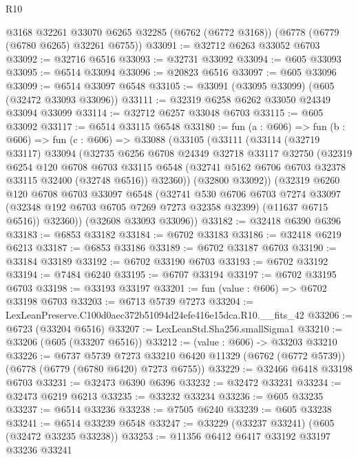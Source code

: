 \begin{lexlean}{R10}
\begin{coremodule}
    @3168
    @32261
    @33070
    @6265
    @32285
    (@6762 (@6772 @3168))
    (@6778 (@6779 (@6780 @6265) @32261 @6755))
@33091 := @32712 @6263 @33052 @6703
@33092 := @32716 @6516
@33093 := @32731 @33092
@33094 := @605 @33093
@33095 := @6514 @33094
@33096 := @20823 @6516
@33097 := @605 @33096
@33099 := @6514 @33097 @6548
@33105 := @33091 (@33095 @33099) (@605 (@32472 @33093 @33096))
@33111 := @32319 @6258 @6262 @33050 @24349 @33094 @33099
@33114 := @32712 @6257 @33048 @6703
@33115 := @605 @33092
@33117 := @6514 @33115 @6548
@33180 := fun (a : @606) =>
  fun (b : @606) =>
  fun (c : @606) =>
  @33088
    (@33105
      (@33111
        (@33114
          (@32719 @33117)
          @33094
          (@32735
            @6256
            @6708
            @24349
            @32718
            @33117
            @32750
            (@32319
              @6254
              @120
              @6708
              @6703
              @33115
              @6548
              (@32741 @5162 @6706 @6703 @32378 @33115 @32400 (@32748 @6516))
              @32360))
          (@32800 @33092))
        (@32319
          @6260
          @120
          @6708
          @6703
          @33097
          @6548
          (@32741
            @530
            @6706
            @6703
            @7274
            @33097
            (@32348 @192 @6703 @6705 @7269 @7273 @32358 @32399)
            (@11637 @6715 @6516))
          @32360))
      (@32608 @33093 @33096))
@33182 := @32418 @6390 @6396
@33183 := @6853 @33182
@33184 := @6702 @33183
@33186 := @32418 @6219 @6213
@33187 := @6853 @33186
@33189 := @6702 @33187 @6703
@33190 := @33184 @33189
@33192 := @6702 @33190 @6703
@33193 := @6702 @33192
@33194 := @7484 @6240
@33195 := @6707 @33194
@33197 := @6702 @33195 @6703
@33198 := @33193 @33197
@33201 := fun (value : @606) => @6702 @33198 @6703
@33203 := @6713 @5739 @7273
@33204 := LexLeanPreserve.C100d0aec372b51094d24efe416e15dca.R10.__fits_42
@33206 := @6723 (@33204 @6516)
@33207 := LexLeanStd.Sha256.smallSigma1
@33210 := @33206 (@605 (@33207 @6516))
@33212 := (value : @606) -> @33203 @33210
@33226 := @6737
    @5739
    @7273
    @33210
    @6420
    @11329
    (@6762 (@6772 @5739))
    (@6778 (@6779 (@6780 @6420) @7273 @6755))
@33229 := @32466 @6418 @33198 @6703
@33231 := @32473 @6390 @6396
@33232 := @32472 @33231
@33234 := @32473 @6219 @6213
@33235 := @33232 @33234
@33236 := @605 @33235
@33237 := @6514 @33236
@33238 := @7505 @6240
@33239 := @605 @33238
@33241 := @6514 @33239 @6548
@33247 := @33229 (@33237 @33241) (@605 (@32472 @33235 @33238))
@33253 := @11356 @6412 @6417 @33192 @33197 @33236 @33241

\end{coremodule}
\end{lexlean}
